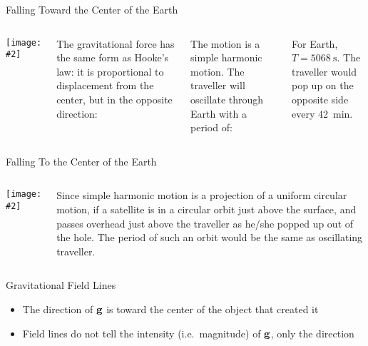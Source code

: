 \documentclass[12pt,compress,aspectratio=169]{beamer}
\newcommand{\pic}[2]{\texttt{[image: \#2]}}
\newcommand{\mb}[1]{\ensuremath\mathbf{#1}}
\newcommand{\eq}[2]{\vspace{#1}{\Large\begin{displaymath}#2\end{displaymath}}}
\begin{document}
\begin{frame}{Falling Toward the Center of the Earth}
  \begin{columns}
    \pic{1}{eartholsat.png}

    The gravitational force has the same form as Hooke's law: it is
    proportional to displacement from the center, but in the opposite
    direction:

    \eq{-.2in}{
      F_g(r)=-kr
    }
    
    \vspace{-.15in}The motion is a simple harmonic motion. The traveller will
    oscillate through Earth with a period of:

    \eq{-.2in}{
      T=2\pi\sqrt{\frac{m}{k}}=2\pi\sqrt{\frac{r_\oplus}{g_0}}
    }

    For Earth, $T=\SI{5068}{\second}$. The traveller would pop up on the
    opposite side every \SI{42}{min}.
  \end{columns}
\end{frame}




\begin{frame}{Falling To the Center of the Earth}
  \begin{columns}
    \pic{1}{eartholsat.png}

    Since simple harmonic motion is a projection of a uniform circular motion,
    if a satellite is in a circular orbit just above the surface, and passes
    overhead just above the traveller as he/she popped up out of the hole. The
    period of such an orbit would be the same as oscillating traveller.
  \end{columns}
\end{frame}



\begin{frame}{Gravitational Field Lines}
  \begin{center}
  \end{center}
  \begin{itemize}
  \item The direction of $\mb{g}$ is toward the center of the object that
    created it
  \item Field lines do not tell the intensity (i.e.\ magnitude) of $\mb{g}$,
    only the direction
  \end{itemize}
\end{frame}
\end{document}
